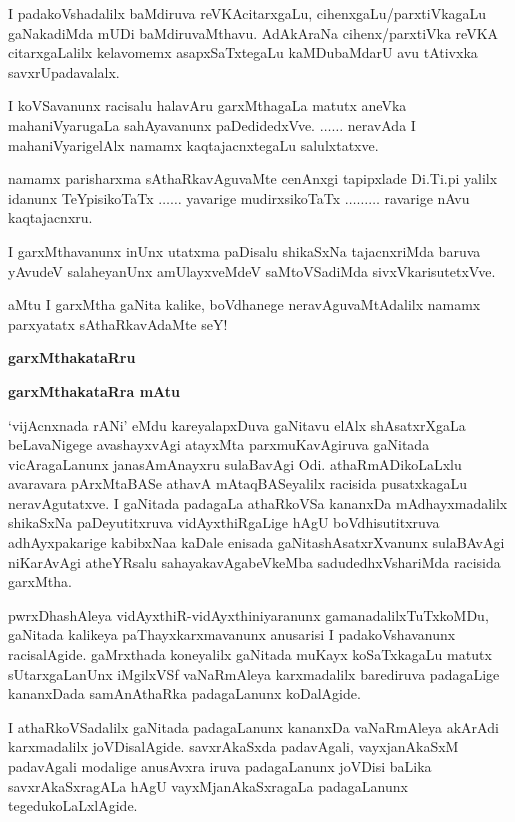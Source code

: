I padakoVshadalilx baMdiruva reVKAcitarxgaLu, cihenxgaLu/parxtiVkagaLu gaNakadiMda mUDi baMdiruvaMthavu. AdAkAraNa cihenx/parxtiVka reVKA citarxgaLalilx kelavomemx asapxSaTxtegaLu kaMDubaMdarU avu tAtivxka savxrUpadavalalx.

I koVSavanunx racisalu halavAru garxMthagaLa matutx aneVka mahaniVyarugaLa sahAyavanunx paDedidedxVve. 
$\ldots\ldots$ neravAda I mahaniVyarigelAlx namamx kaqtajacnxtegaLu salulxtatxve.

namamx parisharxma sAthaRkavAguvaMte cenAnxgi tapipxlade Di.Ti.pi yalilx idanunx TeYpisikoTaTx    
 $\ldots\ldots$ yavarige mudirxsikoTaTx  $\ldots\ldots\ldots$ ravarige nAvu kaqtajacnxru.

I garxMthavanunx inUnx utatxma paDisalu shikaSxNa tajacnxriMda baruva yAvudeV salaheyanUnx amUlayxveMdeV saMtoVSadiMda sivxVkarisutetxVve.

aMtu I garxMtha gaNita kalike, boVdhanege neravAguvaMtAdalilx namamx parxyatatx sAthaRkavAdaMte seY!

\vskip 1.5cm

\noindent
{}\hfill {\large\bf garxMthakataRru}\qquad\qquad\,

\smallskip
\noindent
{}


\newpage

\begin{center}
{\huge\bf garxMthakataRra mAtu}
\end{center}

`vijAcnxnada rANi' eMdu kareyalapxDuva gaNitavu elAlx shAsatxrXgaLa beLavaNigege avashayxvAgi atayxMta parxmuKavAgiruva gaNitada vicAragaLanunx janasAmAnayxru sulaBavAgi Odi. athaRmADikoLaLxlu avaravara pArxMtaBASe athavA mAtaqBASeyalilx racisida pusatxkagaLu neravAgutatxve. I gaNitada padagaLa athaRkoVSa kananxDa mAdhayx\-madalilx shikaSxNa paDeyutitxruva vidAyxthiRgaLige hAgU boVdhisutitxruva adhAyxpakarige kabibxNaa kaDale enisada gaNitashAsatxrXvanunx sulaBAvAgi niKarAvAgi atheYRsalu sahayakavAgabeVkeMba sadudedhxVshariMda racisida garxMtha.

pwrxDhashAleya vidAyxthiR-vidAyxthiniyaranunx gamanadalilxTuTxkoMDu, gaNitada kalikeya paThayxkarxmavanunx anusarisi I padakoVshavanunx racisalAgide. gaMrxthada koneyalilx gaNitada muKayx koSaTxkagaLu matutx sUtarxgaLanUnx iMgilxVSf vaNaRmAleya karxmadalilx barediruva padagaLige kananxDada samAnAthaRka padagaLanunx koDalAgide.

I athaRkoVSadalilx gaNitada padagaLanunx kananxDa vaNaRmAleya akArAdi karxmadalilx joVDisalAgide. savxrAkaSxda padavAgali, vayxjanAkaSxM padavAgali modalige anusAvxra iruva padagaLanunx joVDisi baLika savxrAkaSxragALa hAgU vayxMjanAkaSxragaLa padagaLanunx tegedukoLaLxlAgide.

